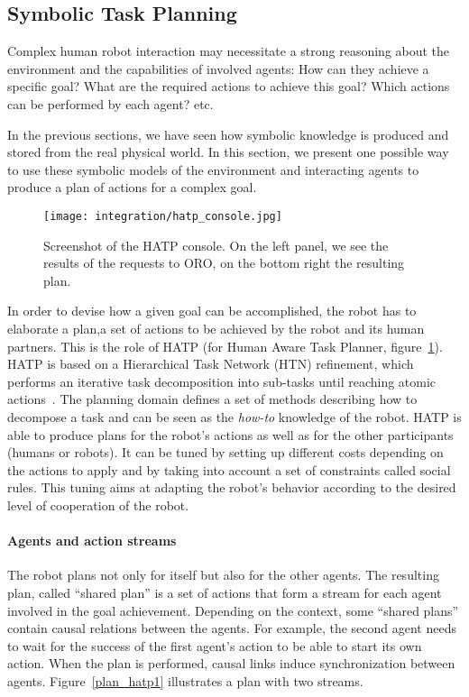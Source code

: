 
\subsection{Symbolic Task Planning}

Complex human robot interaction may necessitate a strong reasoning about the
environment and the capabilities of involved agents: How can they achieve a
specific goal? What are the required actions to achieve this goal? Which
actions can be performed by each agent? etc.

In the previous sections, we have seen how symbolic knowledge is produced and
stored from the real physical world. In this section, we present one possible
way to use these symbolic models of the environment and interacting agents to
produce a plan of actions for a complex goal.

\begin{figure}
    \centering
    \texttt{[image: integration/hatp\_console.jpg]}
    \caption{Screenshot of the HATP console. On the left panel, we see the
    results of the requests to ORO, on the bottom right the resulting plan.}
    \label{fig|hatp_console}
\end{figure}

In order to devise how a given goal can be accomplished, the robot has to
elaborate a plan,\ie a set of actions to be achieved by the robot and its human
partners.  This is the role of HATP \cite{Alili2008} (for Human Aware Task
Planner, figure~\ref{fig|hatp_console}).  HATP is based on a Hierarchical Task
Network (HTN) refinement, which performs an iterative task decomposition into
sub-tasks until reaching atomic actions~\cite{Nau2003}.  The planning domain
defines a set of methods describing how to decompose a task and can be seen as
the {\it how-to} knowledge of the robot.  HATP is able to produce plans for the
robot's actions as well as for the other participants (humans or robots). It
can be tuned by setting up different costs depending on the actions to apply
and by taking into account a set of constraints called social rules. This
tuning aims at adapting the robot's behavior according to the desired level of
cooperation of the robot.

\paragraph{Agents and action streams} The robot plans not only for itself but
also for the other agents. The resulting plan, called ``shared plan'' is a set
of actions that form a stream for each agent involved in the goal achievement.
Depending on the context, some ``shared plans'' contain causal relations
between the agents. For example, the second agent needs to wait for the success
of the first agent's action to be able to start its own action. When the plan
is performed, causal links induce synchronization between agents.
Figure~\ref{plan_hatp1} illustrates a plan with two streams.


